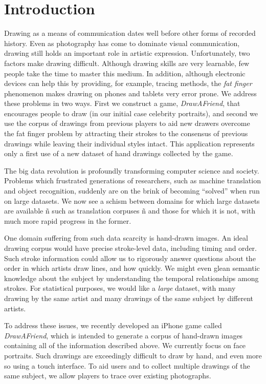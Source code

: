 \section{Introduction}

Drawing as a means of communication dates well before other forms of
recorded history. Even as photography has come to dominate visual
communication, drawing still holds an important role in artistic
expression. Unfortunately, two factors make drawing difficult.
Although drawing skills are very learnable, few people take the time
to master this medium. In addition, although electronic devices can
help this by providing, for example, tracing methods, the {\em fat
finger} phenomenon makes drawing on phones and tablets very error
prone. We address these problems in two ways. First we construct a
game, {\em DrawAFriend}, that encourages people to draw (in our
initial case celebrity portraits), and second we use the corpus of
drawings from previous players to aid new drawers overcome the fat
finger problem by attracting their strokes to the consensus of
previous drawings while leaving their individual styles intact. This
application represents only a first use of a new dataset of hand
drawings collected by the game.

The big data revolution is profoundly transforming computer science
and society. Problems which frustrated generations of researchers,
such as machine translation and object recognition, suddenly are on
the brink of becoming ``solved'' when run on large datasets. We now
see a schism between domains for which large datasets are available
ñ such as translation corpuses ñ and those for which it is not,
with much more rapid progress in the former.

One domain suffering from such data scarcity is hand-drawn images.
An ideal drawing corpus would have precise stroke-level data,
including timing and order. Such stroke information could allow us
to rigorously answer questions about the order in which artists draw
lines, and how quickly. We might even glean semantic knowledge about
the subject by understanding the temporal relationships among
strokes. For statistical purposes, we would like a \emph{large}
dataset, with many drawing by the same artist and many drawings of
the same subject by different artists.

To address these issues, we recently developed an iPhone game called
\emph{DrawAFriend}, which is intended to generate a corpus of
hand-drawn images containing all of the information described above.
We currently focus on face portraits. Such drawings are exceedingly
difficult to draw by hand, and even more so using a touch interface.
To aid users and to collect multiple drawings of the same subject,
we allow players to trace over existing photographs.

